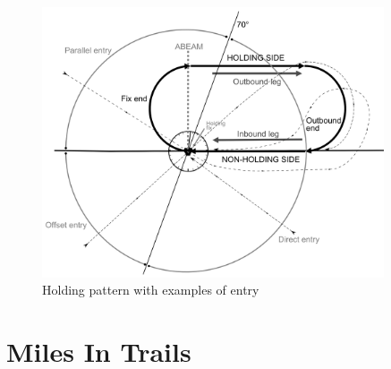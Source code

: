 \begin{figure}[h]
    \centering
    \includegraphics[width=0.9\textwidth]{figures/holding.png}
    \caption{Holding pattern with examples of entry}
    \label{fig:holding}
\end{figure}





\section{Miles In Trails}